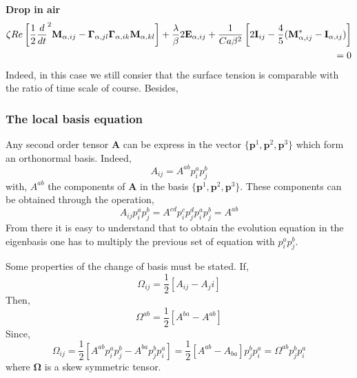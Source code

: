 
\textbf{Drop in air }
\begin{align*}
    \zeta Re\left[
         \frac{1}{2}\frac{d}{d t}^2 \textbf{M}_{\alpha,ij}
    -    \bm\Gamma_{\alpha,jl}\bm\Gamma_{\alpha,ik} \textbf{M}_{\alpha,kl}  
    \right]
    +   
        \frac{\lambda}{\beta} 2\textbf{E}_{\alpha,ij}
    + \frac{1}{Ca\beta^2} \left[
    2\textbf{I}_{ij} 
    - \frac{4  }{5} (\textbf{M}_{\alpha,ij}^* - \textbf{I}_{\alpha,ij})
    \right]\\
    = 
    0 
\end{align*}
Indeed, in this case we still consier that the surface tension is comparable with the ratio of time scale of course. 
Besides, 



\subsubsection*{The local basis equation}

Any second order tensor $\textbf{A}$ can be express in the vector $\{\textbf{p}^1,\textbf{p}^2,\textbf{p}^3\}$ which form an orthonormal basis. 
Indeed, 
\begin{equation}
    A_{ij}
    = 
    A^{ab}
    p_i^a
    p_j^b
\end{equation}
with, $A^{ab}$ the components of \textbf{A} in the basis $\{\textbf{p}^1,\textbf{p}^2,\textbf{p}^3\}$. 
These components can be obtained through the operation, 
\begin{equation*}
    A_{ij} 
    p_i^a
    p_j^b
    = 
    A^{cd}
    p_i^c
    p_j^d
    p_i^a
    p_j^b
    = 
    A^{ab}
\end{equation*}
From there it is easy to understand that to obtain the evolution equation in the eigenbasis one has to multiply the previous set of equation with $p_i^ap_j^b$. 

Some properties of the change of basis must be stated. 
If, 
\begin{equation}
    \Omega_{ij} = \frac{1}{2} [A_{ij}-A_ji]
\end{equation}
Then, 
\begin{equation}
    \Omega^{ab} = \frac{1}{2} [A^{ba}-A^{ab}]
\end{equation}
Since, 
\begin{equation}
    \Omega_{ij} = \frac{1}{2} [A^{ab} p^a_i p^b_j-A^{ba} p^b_j p^a_i]
    =  \frac{1}{2} [A^{ab} - A_{ba} ]p^b_j p^a_i
    =  \Omega^{ab} p^b_j p^a_i
\end{equation}
where $\bm\Omega$ is a skew symmetric tensor. 



